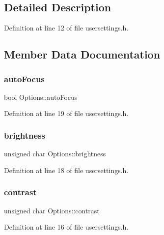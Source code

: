 \subsection{Detailed Description}


Definition at line 12 of file usersettings.\+h.



\subsection{Member Data Documentation}
\mbox{\label{structOptions_aab21de2c0338e19de5bf8f6f2c1e5fb6}} 
\subsubsection{\texorpdfstring{autoFocus}{autoFocus}}
{\footnotesize\ttfamily bool Options\+::auto\+Focus}



Definition at line 19 of file usersettings.\+h.

\mbox{\label{structOptions_add944f0eb9d34b2beb6ffe7a8c7797f7}} 
\subsubsection{\texorpdfstring{brightness}{brightness}}
{\footnotesize\ttfamily unsigned char Options\+::brightness}



Definition at line 18 of file usersettings.\+h.

\mbox{\label{structOptions_a983362fb0677019296772367eb16dca1}} 
\subsubsection{\texorpdfstring{contrast}{contrast}}
{\footnotesize\ttfamily unsigned char Options\+::contrast}



Definition at line 16 of file usersettings.\+h.

\mbox{\label{structOptions_a444d9527822f32e094907b1a8aa88d35}} 
